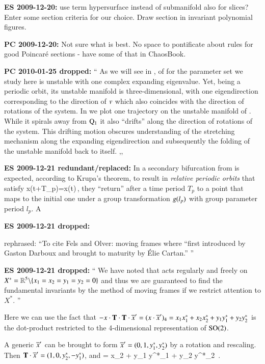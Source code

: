 {\bf ES 2009-12-20:}
use term hypersurface instead of submanifold also for slices?
Enter some section criteria for our choice. Draw section
in in\-vari\-ant polynomial figures.

{\bf PC 2009-12-20:}
Not sure what is best. No space to pontificate about rules
for good Poincar\'e sections - have some of that in ChaosBook.

{\bf PC 2010-01-25 dropped:}
``
As we will see in ,  of {\cLe}
for the parameter set we study here is unstable with one
complex expanding eigenvalue. Yet, being a periodic orbit,
its unstable manifold is three-dimensional, with one
eigendirection corresponding to the direction of $v$ which
also coincides with the direction of rotations of the system.
In  we plot one trajectory on the unstable
manifold of . While it spirals away from
$\mathrm{Q}_{1}$ it also ``drifts'' along the direction of
rotations of the system. This drifting motion obscures
understanding of the stretching mechanism along the expanding
eigendirection and subsequently the folding of the unstable
manifold back to itself.
,,

{\bf ES 2009-12-21 redundant/replaced:}
In {\cLe} a secondary
bifurcation from  is expected, according to Krupa's
theorem, to result in \emph{relative periodic
orbits} that satisfy
\beq
	x(t+T_p)=x(t)\,,
\eeq
{\ie} they ``return'' after a time period $T_p$ to a point
that maps to the initial one under a group transformation
$g(l_p)$ with group parameter period $l_p$. A {\rpo}

{\bf ES 2009-12-21 dropped:}

rephrased: ``To cite Fels and Olver:
moving frames where ``first introduced by Gaston Darboux
and brought to maturity by \'Elie Cartan.''
''

{\bf ES 2009-12-21 dropped:}
``
We have noted that  acts regularly and freely on
$X^*=\mathbb{R}^{5}\backslash\{x_1=x_2=y_1=y_2=0\}$ and thus we are
guaranteed to find the fundamental invariants by the method
of moving frames if we restrict attention to $X^*$.
''

Here we can use the fact that
$- x \cdot \mathbf{T}\cdot\mathbf{T} \cdot {\ensuremath{\overline{x}'}}
 = (x \cdot {\ensuremath{\overline{x}'}} )_4 =
    x_1 x_1^{*}
   +x_2 x_2^{*}
   +y_1 y_1^{*}
   +y_2 y_2^{*}
$
is the dot-product restricted to the 4-dimensional
representation of $\textrm{SO}(2)$.

A generic  $ {\overline{x}'} $ can be brought to form $ {\overline{x}'}  =
(0,1,y_1^{*},y_2^{*})$ by a rotation and rescaling. Then $\mathbf{T}
\cdot {\ensuremath{\overline{x}'}}   = (1,0,y_2^{*},-y_1^{*})$, and
\beq
{} =
     {x_2 + y_1 y^{*}_1 + y_2 y^{*}_2}
\,.
\label{PCsectSin}
\eeq


